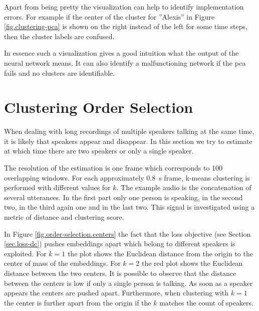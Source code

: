Apart from being pretty the visualization can help to identify implementation errors. For example if the center of the cluster for ''Alexis'' in Figure \ref{fig.clustering-pca} is shown on the right instead of the left for some time steps, then the cluster labels are confused.

In essence such a visualization gives a good intuition what the output of the neural network means. It can also identify a malfunctioning network if the \gls{pca} fails and no clusters are identifiable.

\section{Clustering Order Selection}\label{sec.order-selection}

When dealing with long recordings of multiple speakers talking at the same time, it is likely that speakers appear and disappear. In this section we try to estimate at which time there are two speakers or only a single speaker.

The resolution of the estimation is one frame which corresponds to 100 overlapping windows. For each approximately \SI{0.8}{\second} frame, k-means clustering is performed with different values for $k$. The example audio is the concatenation of several utterances. In the first part only one person is speaking, in the second two, in the third again one and in the last two. This signal is investigated using a metric of distance and clustering score.

In Figure \ref{fig.order-selection.centers} the fact that the loss objective (see Section  \ref{sec.loss-dc}) pushes embeddings apart which belong to different speakers is exploited. For $k=1$ the plot shows the Euclidean distance from the origin to the center of mass of the embeddings. For $k=2$ the red plot shows the Euclidean distance between the two centers.
It is possible to observe that the distance between the centers is low if only a single person is talking. As soon as a speaker appears the centers are pushed apart.
Furthermore, when clustering with $k=1$ the center is further apart from the origin if the $k$ matches the count of speakers. 

